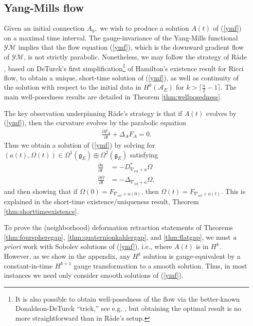\documentclass[12pt]{amsart}
\renewcommand{\1}{{\mathbf 1}}
\theoremstyle{others}
\numberwithin{equation}{section}
\begin{document}
\vspace{5mm}



\subsection{Yang-Mills flow}
Given an initial connection $A_0,$ we wish to produce a solution $A(t)$ of (\ref{ymf}) on a maximal time interval. The gauge-invariance of the Yang-Mills functional \(\mathcal{YM}\) implies that the flow equation (\ref{ymf}), which is the downward gradient flow of \(\mathcal{YM}\), is not strictly parabolic. Nonetheless, we may follow the strategy of R{\aa}de \cite[Theorem 1]{rade}, based on DeTurck's first simplification\footnote{It is also possible to obtain well-posedness of the flow via the better-known Donaldson-DeTurck ``trick,'' see e.g. \cite{kozonomaedanaito4dglobal, ohtatarucaloric, struweym}, but obtaining the optimal result is no more straightforward than in R\aa de's setup.} \cite{deturckfirsttrick} of Hamilton's existence result for Ricci flow, to obtain a unique, short-time solution of (\ref{ymf}), as well as continuity of the solution with respect to the initial data in \(H^k(\mathcal{A}_E)\) for \(k > \lceil\frac{n}{2}-1\rceil\). The main well-posedness results are detailed in Theorem \ref{thm:wellposedness}. \par 
The key observation underpinning R{\aa}de's strategy is that if \(A(t)\) evolves by (\ref{ymf}), then the curvature evolves by the parabolic equation
\begin{align}\label{preliminaries:evolutionofcurvature}
    \frac{\partial F_A}{\partial t} + \Delta_A F_A = 0.
\end{align} Thus we obtain a solution of (\ref{ymf}) by solving for \((a(t), \Omega(t)) \in \Omega^1(\mathfrak{g}_E) \oplus \Omega^2(\mathfrak{g}_E)\) satisfying
\begin{align*}
    \frac{\partial a}{\partial t} &= -D_{\nabla_{\text{ref}} + a}^\ast \Omega \\
    \frac{\partial \Omega}{\partial t} &= -\Delta_{\nabla_{\text{ref}} + a} \Omega,
\end{align*} and then showing that if \(\Omega(0) = F_{\nabla_{\text{ref}} + a(0)}\), then \(\Omega(t) = F_{\nabla_{\text{ref}} + a(t)}\). This is explained in the short-time existence/uniqueness result, Theorem \ref{thm:shorttimeexistence}. \par
To prove the (neighborhood) deformation retraction statements of Theorems \ref{thm:fourspheregap}, \ref{thm:quaternionkahlergap}, and \ref{thm:flatgap}, we must \textit{a priori} work with Sobolev solutions of (\ref{ymf}), i.e., where \(A(t)\) is in \(H^k\). However, as we show in the appendix, any \(H^k\) solution is gauge-equivalent by a constant-in-time \(H^{k+1}\) gauge transformation to a smooth solution. Thus, in most instances we need only consider smooth solutions of (\ref{ymf}). \par 
\end{document}
